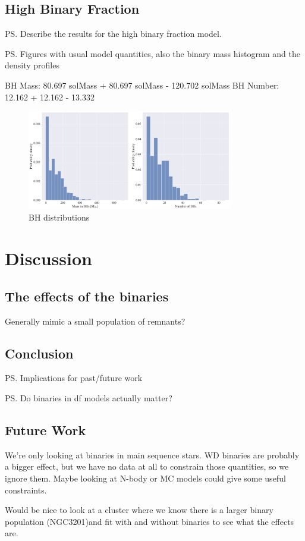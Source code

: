 \subsection{High Binary Fraction}
\ps{Describe the results for the high binary fraction model.}

\ps{Figures with usual model quantities, also the binary mass histogram and the density profiles}



BH Mass: 80.697 solMass + 80.697 solMass - 120.702 solMass
BH Number: 12.162 + 12.162 - 13.332


\begin{figure}
	\centering
	\includegraphics[width=0.8\textwidth]{figures/high_bin_model/BH_dists.png}
	\caption{BH distributions}
	\label{fig:high_bin_model_BH_dists}
\end{figure}

\section{Discussion}

\subsection{The effects of the binaries}

Generally mimic a small population of remnants?









\subsection{Conclusion}

\ps{Implications for past/future work}

\ps{Do binaries in df models actually matter?}








\subsection{Future Work}

We're only looking at binaries in main sequence stars. WD binaries are probably a bigger effect, but
we have no data at all to constrain those quantities, so we ignore them. Maybe looking at N-body or
MC models could give some useful constraints.

Would be nice to look at a cluster where we know there is a larger binary population (NGC3201)and
fit with and without binaries to see what the effects are.